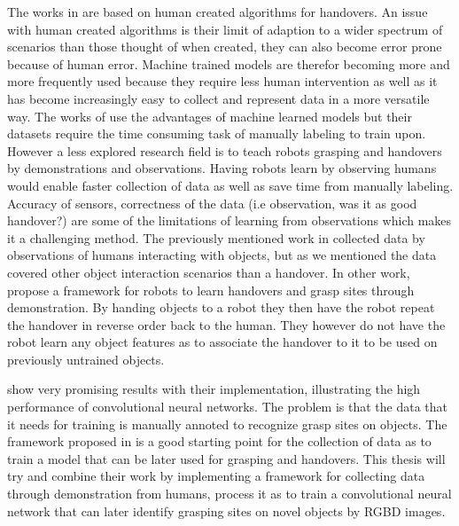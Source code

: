 The works in \parencite{Aleotti2012} \parencite{Suay2015} \parencite{Kim2004} are based on human created algorithms for handovers. An issue with human created algorithms is their limit of adaption to a wider spectrum of scenarios than those thought of when created, they can also become error prone because of human error. Machine trained models are therefor becoming more and more frequently used because they require less human intervention as well as it has become increasingly easy to collect and represent data in a more versatile way. The works of \parencite{Redmon2014} \parencite{Lenz2015} \parencite{Jiang2011} \textcite{Huebner2008a} use the advantages of machine learned models but their datasets require the time consuming task of manually labeling to train upon. However a less explored research field is to teach robots grasping and handovers by demonstrations and observations. Having robots learn by observing humans would enable faster collection of data as well as save time from manually labeling. Accuracy of sensors, correctness of the data (i.e observation, was it as good handover?) are some of the limitations of learning from observations which makes it a challenging method. The previously mentioned work in \parencite{Chan2014} collected data by observations of humans interacting with objects, but as we mentioned the data covered other object interaction scenarios than a handover. In other work, \textcite{Chan2015a} propose a framework for robots to learn handovers and grasp sites through demonstration. By handing objects to a robot they then have the robot repeat the handover in reverse order back to the human. They however do not have the robot learn any object features as to associate the handover to it to be used on previously untrained objects.

\textcite{Redmon2014} show very promising results with their implementation, illustrating the high performance of convolutional neural networks. The problem is that the data that it needs for training is manually annoted to recognize grasp sites on objects. The framework proposed in \parencite{Chan2015a} is a good starting point for the collection of data as to train a model that can be later used for grasping and handovers. This thesis will try and combine their work by implementing a framework for collecting data through demonstration from humans, process it as to train a convolutional neural network that can later identify grasping sites on novel objects by RGBD images.
